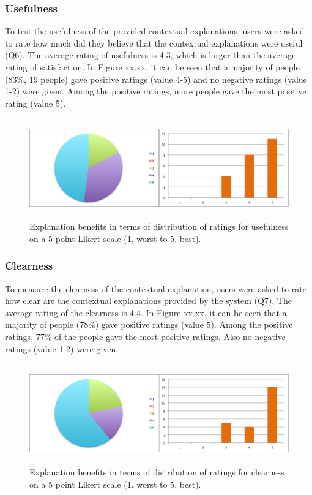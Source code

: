 \subsubsection{Usefulness} \label{sec:results_eb_u}

To test the usefulness of the provided contextual explanations, users were asked to rate how much did they believe that the contextual explanations were useful (Q6). The average rating of usefulness is 4.3, which is larger than the average rating of satisfaction. In Figure xx.xx, it can be seen that a majority of people (83\%, 19 people) gave positive ratings (value 4-5) and no negative ratings (value 1-2) were given. Among the positive ratings, more people gave the most positive rating (value 5).

\begin{figure}[H]
	\centering
	\includegraphics[height=1.7in]{figures/usefulness.png}
	\caption{Explanation benefits in terms of distribution of ratings for usefulness on a 5 point Likert scale (1, worst to 5, best).}
	\label{fig:usefulness}
\end{figure}

\subsubsection{Clearness} \label{sec:results_eb_c}

To measure the clearness of the contextual explanation, users were asked to rate how clear are the contextual explanations provided by the system (Q7). The average rating of the clearness is 4.4. In Figure xx.xx, it can be seen that a majority of people (78\%) gave positive ratings (value 5). Among the positive ratings, 77\% of the people gave the most positive ratings. Also no negative ratings (value 1-2) were given. 

\begin{figure}[H]
	\centering
	\includegraphics[height=1.7in]{figures/clearness.png}
	\caption{Explanation benefits in terms of distribution of ratings for clearness on a 5 point Likert scale (1, worst to 5, best).}
	\label{fig:clearness}
\end{figure}

